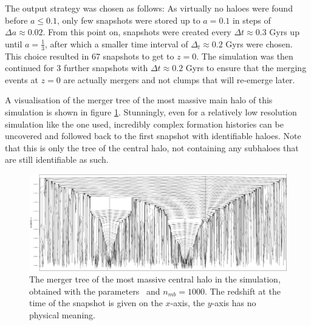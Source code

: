 The output strategy was chosen as follows:
As virtually no haloes were found before $a\leq 0.1$, only few snapshots were stored up to $a=0.1$ in steps of $\Delta a \approx 0.02$.
From this point on, snapshots were created every $\Delta t \approx 0.3$ Gyrs up until $a = \tfrac{1}{3}$, after which a smaller time interval of $\Delta_t \approx 0.2$ Gyrs were chosen.
This choice resulted in 67 snapshots to get to $z = 0$.
The simulation was then continued for 3 further snapshots with $\Delta t \approx 0.2$ Gyrs to ensure that the merging events at $z = 0$ are actually mergers and not clumps that will re-emerge later.

A visualisation of the merger tree of the most massive main halo of this simulation is shown in figure \ref{fig:mergertree}.
Stunningly, even for a relatively low resolution simulation like the one used, incredibly complex formation histories can be uncovered and followed back to the first snapshot with identifiable haloes.
Note that this is only the tree of the central halo, not containing any subhaloes that are still identifiable as such.


\begin{figure}[H]
    \begin{minipage}[c]{0.6\textwidth}
    	\includegraphics[width=25cm, keepaspectratio,angle=90,origin=c]{images/mergertree.pdf}%
    \end{minipage}\hfill
    \begin{minipage}[c]{0.4\textwidth}
    	\caption{
    		The merger tree of the most massive central halo in the simulation, obtained with the parameters \exc\ and $n_{mb}=1000$.
    		The redshift at the time of the snapshot is given on the $x$-axis, the $y$-axis has no physical meaning.
    	}%
    	\label{fig:mergertree}
    \end{minipage}
\end{figure}









